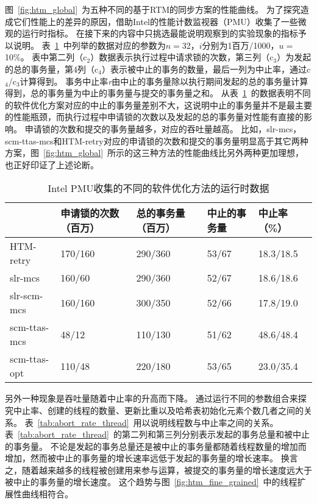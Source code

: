 图~\ref{fig:htm_global}~为五种不同的基于RTM的同步方案的性能曲线。
为了探究造成它们性能上的差异的原因，借助Intel的性能计数监视器（PMU）收集了一些微观的运行时指标。
在接下来的内容中只挑选最能说明观察到的实验现象的指标予以说明。
表~\ref{tab:htm_abort_rate}~中列举的数据对应的参数为$n = $32，$i$分别为1百万/1000，$u = $10\%。
表中第二列（c$_2$）数据表示执行过程中请求锁的次数，第三列（c$_3$）为发起的总的事务量，第4列（c$_4$）表示被中止的事务的数量，最后一列为中止率，通过c$_4$/c$_3$计算得到。
事务中止率\textit{r}由中止的事务量除以执行期间发起的总的事务量计算得到，总的事务量为中止的事务量与提交的事务量之和。
从表~\ref{tab:htm_abort_rate}~的数据表明不同的软件优化方案对应的中止的事务量差别不大，这说明中止的事务量并不是最主要的性能瓶颈，而执行过程中申请锁的次数以及发起的总的事务量对性能有直接的影响。
申请锁的次数和提交的事务量越多，对应的吞吐量越高。
比如，slr-mcs，scm-ttas-mcs和HTM-retry对应的申请锁的次数和提交的事务量明显高于其它两种方案，图~\ref{fig:htm_global}~所示的这三种方法的性能曲线比另外两种更加理想，也正好印证了上述论断。

\begin{table}[htbp]
  \centering
  \caption{Intel PMU收集的不同的软件优化方法的运行时数据}
  \label{tab:htm_abort_rate}
  \begin{tabular}{lllll}
    \toprule
                  & 申请锁的次数（百万） & 总的事务量（百万） & 中止的事务量 & 中止率（\%） \\
    \midrule
      HTM-retry   & 170/160           & 290/360         & 53/67      & 18.3/18.5 \\
      slr-mcs     & 160/60            & 290/360         & 52/67      & 18.6/18.6 \\
      slr-scm-mcs & 160/160           & 300/350         & 52/66      & 17.8/19.0 \\
      scm-ttas-mcs& 48/12             & 110/130         & 51/62      & 48.6/48.4 \\
      scm-ttas-opt& 110/48            & 220/180         & 53/65      & 23.0/35.4 \\
    \bottomrule
  \end{tabular}
\end{table}

另外一种现象是吞吐量随着中止率的升高而下降。
通过运行不同的参数组合来探究中止率、创建的线程的数量、更新比重以及哈希表初始化元素个数几者之间的关系。
表~\ref{tab:abort_rate_thread}~用以说明线程数与中止率之间的关系。
表~\ref{tab:abort_rate_thread}~的第二列和第三列分别表示发起的事务总量和被中止的事务量。
不论是发起的事务总量还是被中止的事务量都随着线程数量的增加而增加，然而被中止的事务量的增长速率远低于发起的事务量的增长速率。
换言之，随着越来越多的线程被创建用来参与运算，被提交的事务量的增长速度远大于被中止的事务量的增长速度。
这个趋势与图~\ref{fig:htm_fine_grained}~中的线程扩展性曲线相符合。

